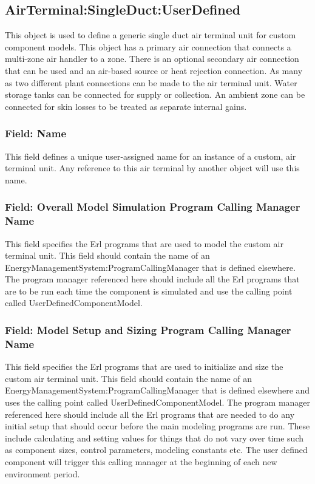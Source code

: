 \subsection{AirTerminal:SingleDuct:UserDefined}\label{airterminalsingleductuserdefined}

This object is used to define a generic single duct air terminal unit for custom component models. This object has a primary air connection that connects a multi-zone air handler to a zone. There is an optional secondary air connection that can be used and an air-based source or heat rejection connection. As many as two different plant connections can be made to the air terminal unit. Water storage tanks can be connected for supply or collection. An ambient zone can be connected for skin losses to be treated as separate internal gains.

\subsubsection{Field: Name}\label{field-name-1-046}

This field defines a unique user-assigned name for an instance of a custom, air terminal unit. Any reference to this air terminal by another object will use this name.

\subsubsection{Field: Overall Model Simulation Program Calling Manager Name}\label{field-overall-model-simulation-program-calling-manager-name-1}

This field specifies the Erl programs that are used to model the custom air terminal unit. This field should contain the name of an EnergyManagementSystem:ProgramCallingManager that is defined elsewhere. The program manager referenced here should include all the Erl programs that are to be run each time the component is simulated and use the calling point called UserDefinedComponentModel.

\subsubsection{Field: Model Setup and Sizing Program Calling Manager Name}\label{field-model-setup-and-sizing-program-calling-manager-name-1}

This field specifies the Erl programs that are used to initialize and size the custom air terminal unit. This field should contain the name of an EnergyManagementSystem:ProgramCallingManager that is defined elsewhere and uses the calling point called UserDefinedComponentModel. The program manager referenced here should include all the Erl programs that are needed to do any initial setup that should occur before the main modeling programs are run. These include calculating and setting values for things that do not vary over time such as component sizes, control parameters, modeling constants etc. The user defined component will trigger this calling manager at the beginning of each new environment period.

